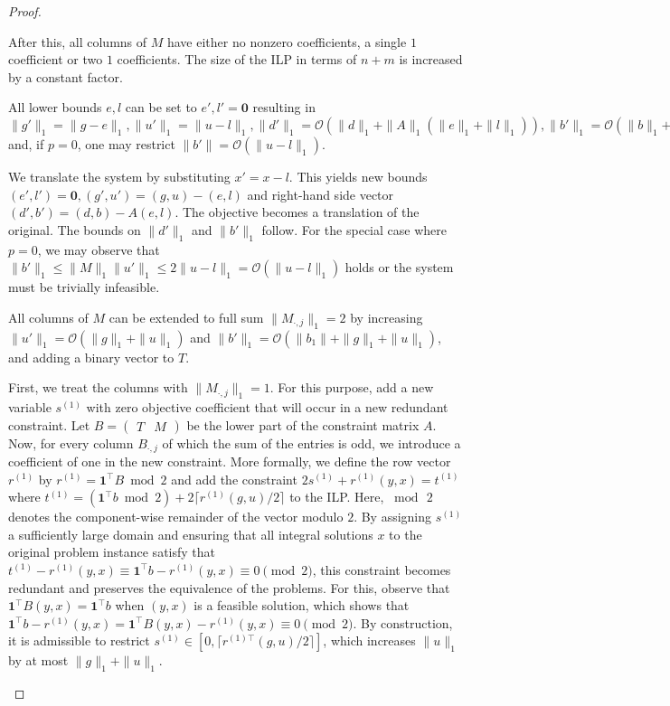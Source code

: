\documentclass[a4paper,UKenglish,cleveref,thm-restate]{lipics-v2021}
\newcommand{\veczero}{\mathbf0}
\newcommand{\vecone}{\mathbf1}
\renewcommand{\O}{\mathcal O}
\begin{document}
\begin{proof}
\begin{claimproof}
        After this, all columns of $M$ have either no nonzero coefficients, a single $1$ coefficient or two $1$ coefficients. The size of the ILP in terms of $n+m$ is increased by a constant factor.
    \end{claimproof}
    \begin{claim*}
        All lower bounds $e,l$ can be set to $e',l'=\veczero$ resulting in $\|g'\|_1=\|g-e\|_1,\|u'\|_1=\|u-l\|_1,\|d'\|_1=\O(\|d\|_1+\|A\|_1(\|e\|_1+\|l\|_1)),\|b'\|_1=\O(\|b\|_1+\|A\|_1(\|e\|_1+\|l\|_1))$ and, if $p=0$, one may restrict $\|b'\|=\O(\|u-l\|_1)$.
    \end{claim*}
    \begin{claimproof}
        We translate the system by substituting $x'=x-l$. This yields new bounds $(e',l')=\veczero,(g',u')=(g,u)-(e,l)$ and right-hand side vector $(d',b')=(d,b)-A(e,l)$. The objective becomes a translation of the original. The bounds on $\|d'\|_1$ and $\|b'\|_1$ follow. For the special case where $p=0$, we may observe that $\|b'\|_1\le\|M\|_1\|u'\|_1\le2\|u-l\|_1=\O(\|u-l\|_1)$ holds or the system must be trivially infeasible.
    \end{claimproof}
    \begin{claim*}
        All columns of $M$ can be extended to full sum $\|M_{\cdot,j}\|_1=2$ by increasing $\|u'\|_1=\O(\|g\|_1+\|u\|_1)$ and $\|b'\|_1=\O(\|b_1\|+\|g\|_1+\|u\|_1)$, and adding a binary vector to $T$.
    \end{claim*}
    \begin{claimproof}
        First, we treat the columns with $\|M_{\cdot,j}\|_1=1$. For this purpose, add a new variable $s^{(1)}$ with zero objective coefficient that will occur in a new redundant constraint. Let $B=\begin{pmatrix}T&M\end{pmatrix}$ be the lower part of the constraint matrix $A$. Now, for every column $B_{\cdot,j}$ of which the sum of the entries is odd, we introduce a coefficient of one in the new constraint. More formally, we define the row vector $r^{(1)}$ by $r^{(1)}=\vecone^\top B\bmod2$ and add the constraint $2s^{(1)}+r^{(1)}(y,x)=t^{(1)}$ where $t^{(1)}=(\vecone^\top b\bmod2)+2\lceil r^{(1)}(g,u)/2\rceil$ to the ILP. Here, $\bmod\,2$ denotes the component-wise remainder of the vector modulo $2$. By assigning $s^{(1)}$ a sufficiently large domain and ensuring that all integral solutions $x$ to the original problem instance satisfy that $t^{(1)}-r^{(1)}(y,x)\equiv\vecone^\top b-r^{(1)}(y,x)\equiv0\pmod2$, this constraint becomes redundant and preserves the equivalence of the problems. For this, observe that $\vecone^\top B(y,x)=\vecone^\top b$ when $(y,x)$ is a feasible solution, which shows that $\vecone^\top b-r^{(1)}(y,x)=\vecone^\top B(y,x)-r^{(1)}(y,x)\equiv0\pmod2$. By construction, it is admissible to restrict $s^{(1)}\in[0,\lceil r^{(1)\top}(g,u)/2\rceil]$, which increases $\|u\|_1$ by at most $\|g\|_1+\|u\|_1$.


\end{claimproof}
\end{proof}
\end{document}
